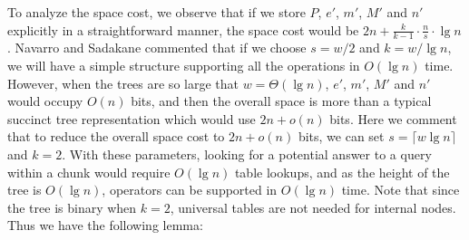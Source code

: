 %

To analyze the space cost, we observe that if we store $P$, $e'$, $m'$, $M'$ and $n'$ explicitly in a straightforward manner, the space cost would be $2n + \frac{k}{k-1} \cdot \frac{n}{s} \cdot \lg n$. 
Navarro and Sadakane commented that if we choose $s = w/2$ and $k = w / \lg n$, we will have a simple structure supporting all the operations in $O(\lg n)$ time. 
However, when the trees are so large that $w = \Theta(\lg n)$, $e'$, $m'$, $M'$ and $n'$ would occupy $O(n)$ bits, and then the overall space is more than a typical succinct tree representation which would use $2n+o(n)$ bits. 
Here we comment that to reduce the overall space cost to $2n+o(n)$ bits, we can set $s = \lceil w\lg n\rceil$ and $k = 2$. With these parameters, looking for a potential answer to a query within a chunk would require $O(\lg n)$ table lookups, and as the height of the tree is $O(\lg n)$, operators can be supported in $O(\lg n)$ time. Note that since the tree is binary when $k = 2$, universal tables are not needed for internal nodes. Thus we have the following lemma:

